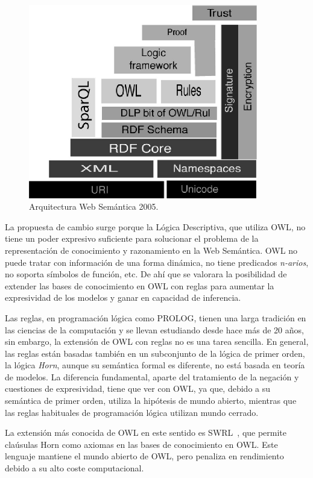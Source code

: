 \begin{figure}[!htbp]
\centering
	\includegraphics[width=10cm]{images/sw-stack-2005}
\caption{Arquitectura Web Semántica 2005.}
\label{fig:stack-2005}
\end{figure}

La propuesta de cambio surge porque la Lógica Descriptiva, que utiliza \gls{OWL}, no
tiene un poder expresivo suficiente para solucionar el problema de la
representación de conocimiento y razonamiento en la Web Semántica. OWL no puede
tratar con información de una forma dinámica, no tiene predicados \textit{n-arios}, no
soporta símbolos de función, etc. De ahí que se valorara la posibilidad de extender las bases
de conocimiento en OWL con reglas para aumentar la expresividad de los modelos y
ganar en capacidad de inferencia.

Las reglas, en programación lógica como PROLOG, tienen una larga tradición en
las ciencias de la computación y se llevan estudiando desde hace más de 20 años, 
sin embargo, la extensión de OWL con reglas no es una tarea sencilla. En general, las reglas 
están basadas también en un subconjunto de la lógica de primer orden, la
lógica \textit{Horn}, aunque su semántica formal es diferente, no está basada en teoría de modelos. La diferencia fundamental, aparte del tratamiento
de la negación y cuestiones de expresividad, tiene que ver con OWL, ya que, 
debido a su semántica de primer orden, utiliza la hipótesis de mundo abierto,
mientras que las reglas habituales de programación lógica utilizan mundo cerrado. 

La extensión más conocida de OWL en este sentido es \gls{SWRL}~\cite{Swrl}, que permite claúsulas
Horn como axiomas en las bases de conocimiento en OWL. Este lenguaje mantiene
el mundo abierto de OWL, pero penaliza en rendimiento debido a su alto coste computacional.

